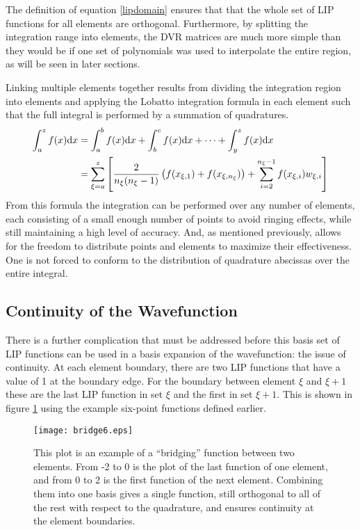 \documentclass[preprint]{revtex4}
\newcommand{\dx}{{\rm d}x}
\begin{document}
The definition of equation \ref{lipdomain} ensures that 
that the whole set of LIP functions for all elements are orthogonal.
Furthermore, by splitting the integration range into elements, 
the DVR matrices are much more simple than they would be if one
set of polynomials was used to interpolate the entire region, as will be 
seen in later sections.  

Linking multiple elements together results from dividing the integration
region into elements and applying the Lobatto integration formula in each 
element such that the full integral is performed by a summation of quadratures. 
\begin{align}
\label{lobatsplit}
\int_a^zf(x)\dx & = \int_a^bf(x)\dx+\int_b^cf(x)\dx+\dots+\int_y^zf(x)\dx \\
\label{lobatint1}
&=\sum_{\xi=a}^{z}\left[\frac{2}{n_\xi(n_\xi-1)}\left(f(x_{\xi,1})+
f(x_{\xi,n_\xi})\right) +\sum_{i=2}^{n_\xi-1}f(x_{\xi,i})w_{\xi,i}\right]
\end{align}
From this formula the integration can be performed over any number of elements,
each consisting of a small enough number of points to avoid ringing effects, 
while still maintaining a high level of accuracy. And, as mentioned previously, 
allows for the freedom to distribute points and elements to maximize their
effectiveness. One is not forced to conform to the distribution of quadrature 
abscissas over the entire integral. 

\subsection{Continuity of the Wavefunction}
There is a further complication that must be addressed before this basis
set of LIP functions can be used in a basis expansion of the wavefunction: 
the issue of continuity. 
At each element boundary, there are two LIP functions that have a value of 1
at the boundary edge. For the boundary between element $\xi$ and $\xi+1$ these
are the last LIP function in set $\xi$ and the first in set $\xi+1$. This 
is shown in figure \ref{bridgechi} using the example six-point functions
defined earlier. 

\begin{figure}[t]
\texttt{[image: bridge6.eps]}
\caption {This plot is an example of a ``bridging'' function between two elements. 
From -2 to 0 is the plot of the last function of one element, and from 0 to 2 is
the first function of the next element. Combining them into one basis gives a
single function, still orthogonal to all of the rest with respect to the quadrature,
and ensures continuity at the element boundaries. }
\label{bridgechi}
\end{figure}
\end{document}
